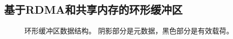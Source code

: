 \subsection{基于RDMA和共享内存的环形缓冲区}
\label{socksdirect:subsec:lockless-queue}

\begin{figure}[htbp]
	\centering
	\hspace{0.02\textwidth}
	
	\caption{环形缓冲区数据结构。 阴影部分是元数据，黑色部分是有效载荷。}
\end{figure}


